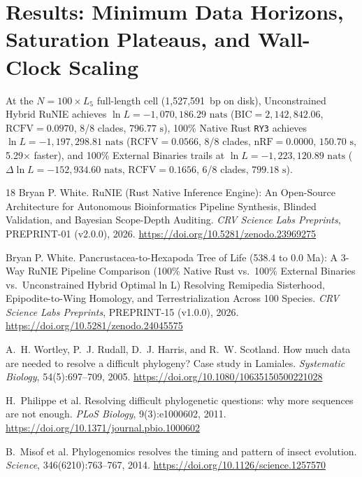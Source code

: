 \documentclass[10pt,letterpaper]{article}
\begin{document}
\section{Results: Minimum Data Horizons, Saturation Plateaus, and Wall-Clock Scaling}
At the $N = 100 \times L_5$ full-length cell (1,527,591~bp on disk), Unconstrained Hybrid RuNIE achieves $\ln L = -1,070,186.29\text{ nats}$ ($\text{BIC} = 2,142,842.06$, $\text{RCFV} = 0.0970$, 8/8 clades, $796.77\text{ s}$), 100\% Native Rust \texttt{RY3} achieves $\ln L = -1,197,298.81\text{ nats}$ ($\text{RCFV} = 0.0566$, 8/8 clades, $\text{nRF} = 0.0000$, $150.70\text{ s}$, 5.29$\times$ faster), and 100\% External Binaries trails at $\ln L = -1,223,120.89\text{ nats}$ ($\Delta\ln L = -152,934.60\text{ nats}$, $\text{RCFV} = 0.1656$, 6/8 clades, $799.18\text{ s}$).

\begin{thebibliography}{18}
Bryan P. White.
\newblock RuNIE (Rust Native Inference Engine): An Open-Source Architecture for Autonomous Bioinformatics Pipeline Synthesis, Blinded Validation, and Bayesian Scope-Depth Auditing.
\newblock \emph{CRV Science Labs Preprints}, PREPRINT-01 (v2.0.0), 2026. \url{https://doi.org/10.5281/zenodo.23969275}

Bryan P. White.
\newblock Pancrustacea-to-Hexapoda Tree of Life (538.4 to 0.0 Ma): A 3-Way RuNIE Pipeline Comparison (100\% Native Rust vs.\ 100\% External Binaries vs.\ Unconstrained Hybrid Optimal ln L) Resolving Remipedia Sisterhood, Epipodite-to-Wing Homology, and Terrestrialization Across 100 Species.
\newblock \emph{CRV Science Labs Preprints}, PREPRINT-15 (v1.0.0), 2026. \url{https://doi.org/10.5281/zenodo.24045575}

A.~H. Wortley, P.~J. Rudall, D.~J. Harris, and R.~W. Scotland.
\newblock How much data are needed to resolve a difficult phylogeny? Case study in Lamiales.
\newblock \emph{Systematic Biology}, 54(5):697--709, 2005. \url{https://doi.org/10.1080/10635150500221028}

H.~Philippe et al.
\newblock Resolving difficult phylogenetic questions: why more sequences are not enough.
\newblock \emph{PLoS Biology}, 9(3):e1000602, 2011. \url{https://doi.org/10.1371/journal.pbio.1000602}

B.~Misof et al.
\newblock Phylogenomics resolves the timing and pattern of insect evolution.
\newblock \emph{Science}, 346(6210):763--767, 2014. \url{https://doi.org/10.1126/science.1257570}


\end{thebibliography}
\end{document}
